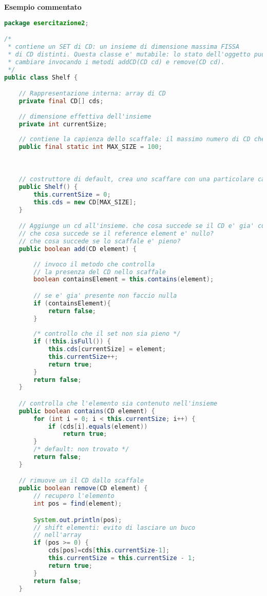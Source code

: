 \documentclass{article}
\begin{document}
\textbf{Esempio commentato}

\begin{lstlisting}[language=Java,escapechar=|]
package esercitazione2;

/*
 * contiene un SET di CD: un insieme di dimensione massima FISSA
 * di CD distinti. Questa classe e' mutabile: lo stato dell'oggetto puo'
 * cambiare invocando i metodi addCD(CD cd) e remove(CD cd).
 */
public class Shelf {

	// Rappresentazione interna: array di CD
	private final CD[] cds;
	
	// dimensione effettiva dell'insieme
	private int currentSize;
	
	// contiene la capienza dello scaffale: il massimo numero di CD che e' possibile contenere
	public final static int MAX_SIZE = 100;

	

	// costruttore di default, crea uno scaffare con una particolare capienza
	public Shelf() {
		this.currentSize = 0;
		this.cds = new CD[MAX_SIZE];
	}

	// Aggiunge un cd all'insieme. che cosa succede se il CD e' gia' contenuto nell'insieme?
	// che cosa succede se il reference element e' nullo?
	// che cosa succede se lo scaffale e' pieno?
	public boolean add(CD element) {
		
		// invoco il metodo che controlla
		// la presenza del CD nello scaffale
		boolean containsElement = this.contains(element);

		// se e' gia' presente non faccio nulla
		if (containsElement){
			return false;
		}
			
		/* controllo che il set non sia pieno */
		if (!this.isFull()) {
			this.cds[currentSize] = element;
			this.currentSize++;
			return true;
		}
		return false;
	}

	// controlla che l'elemento sia contenuto nell'insieme
	public boolean contains(CD element) {
		for (int i = 0; i < this.currentSize; i++) {
			if (cds[i].equals(element))
				return true;
		}
		/* default: non trovato */
		return false;
	}

	// rimuove un il CD dallo scaffale
	public boolean remove(CD element) {
		// recupero l'elemento
		int pos = find(element);

		System.out.println(pos);
		// shift elementi: evito di lasciare un buco
		// nell'array
		if (pos >= 0) {
			cds[pos]=cds[this.currentSize-1];
			this.currentSize = this.currentSize - 1;
			return true;
		}
		return false;
	}


\end{lstlisting}
\end{document}

